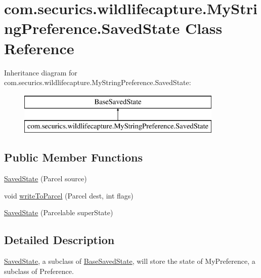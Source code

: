\hypertarget{classcom_1_1securics_1_1wildlifecapture_1_1_my_string_preference_1_1_saved_state}{\section{com.\+securics.\+wildlifecapture.\+My\+String\+Preference.\+Saved\+State Class Reference}
\label{classcom_1_1securics_1_1wildlifecapture_1_1_my_string_preference_1_1_saved_state}
}
Inheritance diagram for com.\+securics.\+wildlifecapture.\+My\+String\+Preference.\+Saved\+State\+:\begin{figure}[H]
\begin{center}
\leavevmode
\includegraphics[height=2.000000cm]{classcom_1_1securics_1_1wildlifecapture_1_1_my_string_preference_1_1_saved_state}
\end{center}
\end{figure}
\subsection*{Public Member Functions}
\begin{DoxyCompactItemize}
\item 
\hyperlink{classcom_1_1securics_1_1wildlifecapture_1_1_my_string_preference_1_1_saved_state_ae06c1cf5c4255e45f8e625df63e7315e}{Saved\+State} (Parcel source)
\item 
void \hyperlink{classcom_1_1securics_1_1wildlifecapture_1_1_my_string_preference_1_1_saved_state_a2e56eff13d09ca11dc96f3dabc8a2763}{write\+To\+Parcel} (Parcel dest, int flags)
\item 
\hyperlink{classcom_1_1securics_1_1wildlifecapture_1_1_my_string_preference_1_1_saved_state_a76a377b5bb005217a7dd469eef204db0}{Saved\+State} (Parcelable super\+State)
\end{DoxyCompactItemize}


\subsection{Detailed Description}
\hyperlink{classcom_1_1securics_1_1wildlifecapture_1_1_my_string_preference_1_1_saved_state}{Saved\+State}, a subclass of \hyperlink{}{Base\+Saved\+State}, will store the state of My\+Preference, a subclass of Preference. 

